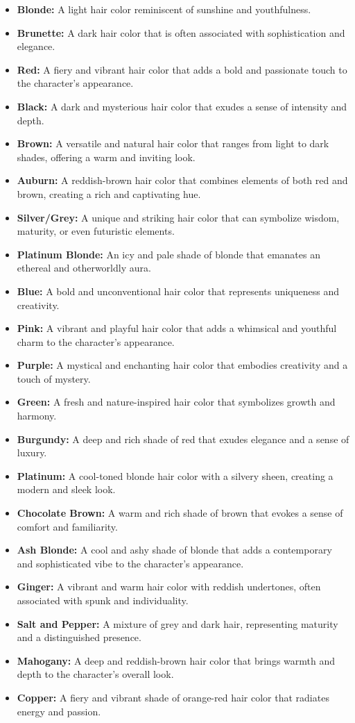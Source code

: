 \documentclass[12pt]{book}
\begin{document}
\begin{itemize}
    \item \textbf{Blonde:} A light hair color reminiscent of sunshine and youthfulness.
    \item \textbf{Brunette:} A dark hair color that is often associated with sophistication and elegance.
    \item \textbf{Red:} A fiery and vibrant hair color that adds a bold and passionate touch to the character's appearance.
    \item \textbf{Black:} A dark and mysterious hair color that exudes a sense of intensity and depth.
    \item \textbf{Brown:} A versatile and natural hair color that ranges from light to dark shades, offering a warm and inviting look.
    \item \textbf{Auburn:} A reddish-brown hair color that combines elements of both red and brown, creating a rich and captivating hue.
    \item \textbf{Silver/Grey:} A unique and striking hair color that can symbolize wisdom, maturity, or even futuristic elements.
    \item \textbf{Platinum Blonde:} An icy and pale shade of blonde that emanates an ethereal and otherworldly aura.
    \item \textbf{Blue:} A bold and unconventional hair color that represents uniqueness and creativity.
    \item \textbf{Pink:} A vibrant and playful hair color that adds a whimsical and youthful charm to the character's appearance.
    \item \textbf{Purple:} A mystical and enchanting hair color that embodies creativity and a touch of mystery.
    \item \textbf{Green:} A fresh and nature-inspired hair color that symbolizes growth and harmony.
    \item \textbf{Burgundy:} A deep and rich shade of red that exudes elegance and a sense of luxury.
    \item \textbf{Platinum:} A cool-toned blonde hair color with a silvery sheen, creating a modern and sleek look.
    \item \textbf{Chocolate Brown:} A warm and rich shade of brown that evokes a sense of comfort and familiarity.
    \item \textbf{Ash Blonde:} A cool and ashy shade of blonde that adds a contemporary and sophisticated vibe to the character's appearance.
    \item \textbf{Ginger:} A vibrant and warm hair color with reddish undertones, often associated with spunk and individuality.
    \item \textbf{Salt and Pepper:} A mixture of grey and dark hair, representing maturity and a distinguished presence.
    \item \textbf{Mahogany:} A deep and reddish-brown hair color that brings warmth and depth to the character's overall look.
    \item \textbf{Copper:} A fiery and vibrant shade of orange-red hair color that radiates energy and passion.
\end{itemize}
\end{document}
